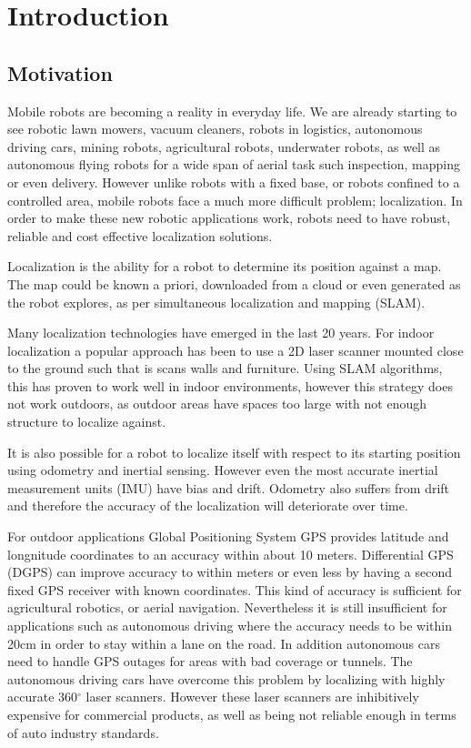 \chapter{Introduction}
\label{chapter:Introduction}


\section{Motivation}

Mobile robots are becoming a reality in everyday life.  We are already starting to see robotic lawn mowers, vacuum cleaners, robots in logistics, autonomous driving cars, mining robots, agricultural robots, underwater robots, as well as autonomous flying robots for a wide span of aerial task such inspection, mapping or even delivery.  However unlike robots with a fixed base, or robots confined to a controlled area, mobile robots face a much more difficult problem; localization.  In order to make these new robotic applications work, robots need to have robust, reliable and cost effective localization solutions.

Localization is the ability for a robot to determine its position against a map.  The map could be known a priori, downloaded from a cloud or even generated as the robot explores, as per simultaneous localization and mapping (SLAM).  

Many localization technologies have emerged in the last 20 years.  For indoor localization a popular approach has been to use a 2D laser scanner mounted close to the ground such that is scans walls and furniture.  Using SLAM algorithms, this has proven to work well in indoor environments, however this strategy does not work outdoors, as outdoor areas have spaces too large with not enough structure to localize against.

It is also possible for a robot to localize itself with respect to its starting position using odometry and inertial sensing.  However even the most accurate inertial measurement units (IMU) have bias and drift.  Odometry also suffers from drift and therefore the accuracy of the localization will deteriorate over time.

For outdoor applications Global Positioning System GPS provides latitude and longnitude coordinates to an accuracy within about 10 meters.  Differential GPS (DGPS) can improve accuracy to within meters or even less by having a second fixed GPS receiver with known coordinates.  This kind of accuracy is sufficient for agricultural robotics, or aerial navigation.  Nevertheless it is still insufficient for applications such as autonomous driving where the accuracy needs to be within 20cm in order to stay within a lane on the road.  In addition autonomous cars need to handle GPS outages for areas with bad coverage or tunnels.  The autonomous driving cars have overcome this problem by localizing with highly accurate 360$^{\circ}$ laser scanners.  However these laser scanners are inhibitively expensive for commercial products, as well as being not reliable enough in terms of auto industry standards.

